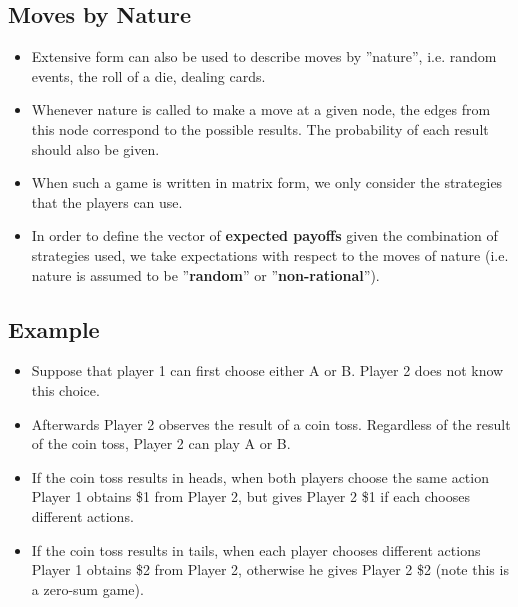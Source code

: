 \documentclass[]{report}
\begin{document}
\subsection{Moves by Nature}
\begin{itemize}
	\item Extensive form can also be used to describe moves by ”nature”,
	i.e. random events, the roll of a die, dealing cards.
\item Whenever nature is called to make a move at a given node, the
	edges from this node correspond to the possible results. The
	probability of each result should also be given.
\item When such a game is written in matrix form, we only consider the
	strategies that the players can use. 
\item In order to define the vector of
	\textbf{expected payoffs} given the combination of strategies used, we
	take expectations with respect to the moves of nature (i.e. nature
	is assumed to be ”\textbf{random}” or ”\textbf{non-rational}”).
\end{itemize}



\subsection{Example}
\begin{itemize}
	\item Suppose that player 1 can first choose either A or B. Player 2 does
	not know this choice.
\item Afterwards Player 2 observes the result of a coin toss. Regardless
	of the result of the coin toss, Player 2 can play A or B.
\item If the coin toss results in heads, when both players choose the
	same action Player 1 obtains \$1 from Player 2, but gives Player 2
	\$1 if each chooses different actions. 
\item If the coin toss results in tails,
	when each player chooses different actions Player 1 obtains \$2
	from Player 2, otherwise he gives Player 2 \$2 (note this is a
	zero-sum game).
\end{itemize}
\end{document}
